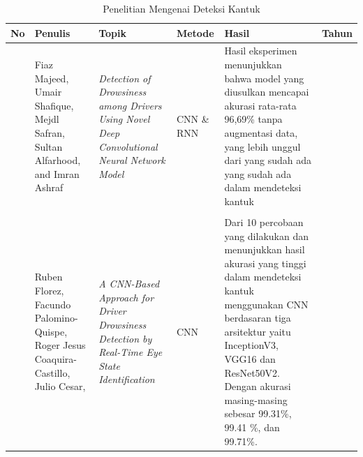       \begin{table}[H]
        \centering
        \caption{Penelitian Mengenai Deteksi Kantuk}
         \label{Tabel Perbandingan Referensi}
        \begin{tabular}%
              {  >{\raggedright\arraybackslash}p{0.3cm} 
        >{\raggedright\arraybackslash}p{2.0cm} 
        >{\raggedright\arraybackslash}p{2.5cm} 
        >{\raggedright\arraybackslash}p{1.5cm} 
        >{\raggedright\arraybackslash}p{4.0cm} 
        >{\raggedright\arraybackslash}p{0.9cm}}
    
            \hline
            \textbf{No} & \textbf{Penulis} & \textbf{Topik} &\textbf{ Metode} & \textbf{Hasil} & \textbf{Tahun} \\
            
            \hline
             1 
            & 
            Fiaz Majeed, Umair Shafique, Mejdl Safran, Sultan Alfarhood, and Imran Ashraf
            &
            \textit{Detection of Drowsiness among Drivers Using Novel Deep Convolutional Neural Network Model}
            & 
            CNN \& RNN
            &
            Hasil eksperimen menunjukkan bahwa model yang diusulkan mencapai akurasi rata-rata 96,69\% tanpa augmentasi data, yang lebih unggul dari yang sudah ada yang sudah ada dalam mendeteksi kantuk 
            &
            2023 \\  
            \\

             2 
            & 
            Ruben Florez, Facundo Palomino-Quispe, Roger Jesus Coaquira-Castillo, Julio Cesar, %
            & 
            \textit{A CNN-Based Approach for Driver Drowsiness Detection by Real-Time Eye State Identification}
            & 
            CNN
            &
            Dari 10 percobaan yang dilakukan dan menunjukkan hasil akurasi yang tinggi dalam mendeteksi kantuk menggunakan CNN berdasaran tiga arsitektur  yaitu InceptionV3, VGG16 dan ResNet50V2. Dengan akurasi masing-masing sebesar 99.31\%, 99.41 \%, dan 99.71\%. 
            &
            2023 \\
                \hline

        \end{tabular}
    \end{table}




